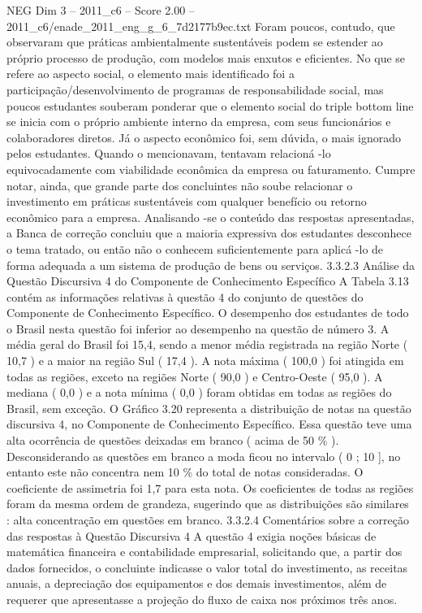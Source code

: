 \begin{textsample}{NEG Dim 3 – 2011\_c6 – Score 2.00 – 2011\_c6/enade\_2011\_eng\_g\_6\_7d2177b9ec.txt}
Foram poucos, contudo, que observaram que práticas ambientalmente sustentáveis podem se estender ao próprio processo de produção, com modelos mais enxutos e eficientes.
No que se refere ao aspecto social, o elemento mais identificado foi a participação/desenvolvimento de programas de responsabilidade social, mas poucos estudantes souberam ponderar que o elemento social do triple bottom line se inicia com o próprio ambiente interno da empresa, com seus funcionários e colaboradores diretos.
Já o aspecto econômico foi, sem dúvida, o mais ignorado pelos estudantes.
Quando o mencionavam, tentavam relacioná -lo equivocadamente com viabilidade econômica da empresa ou faturamento.
Cumpre notar, ainda, que grande parte dos concluintes não soube relacionar o investimento em práticas sustentáveis com qualquer benefício ou retorno econômico para a empresa.
Analisando -se o conteúdo das respostas apresentadas, a Banca de correção concluiu que a maioria expressiva dos estudantes desconhece o tema tratado, ou então não o conhecem suficientemente para aplicá -lo de forma adequada a um sistema de produção de bens ou serviços. 3.3.2.3 Análise da Questão Discursiva 4 do Componente de Conhecimento Específico A Tabela 3.13 contém as informações relativas à questão 4 do conjunto de questões do Componente de Conhecimento Específico.
O desempenho dos estudantes de todo o Brasil nesta questão foi inferior ao desempenho na questão de número 3.
A média geral do Brasil foi 15,4, sendo a menor média registrada na região Norte ( 10,7 ) e a maior na região Sul ( 17,4 ).
A nota máxima ( 100,0 ) foi atingida em todas as regiões, exceto na regiões Norte ( 90,0 ) e Centro-Oeste ( 95,0 ).
A mediana ( 0,0 ) e a nota mínima ( 0,0 ) foram obtidas em todas as regiões do Brasil, sem exceção.
O Gráfico 3.20 representa a distribuição de notas na questão discursiva 4, no Componente de Conhecimento Específico.
Essa questão teve uma alta ocorrência de questões deixadas em branco ( acima de 50 \% ).
Desconsiderando as questões em branco a moda ficou no intervalo ( 0 ; 10 ], no entanto este não concentra nem 10 \% do total de notas consideradas.
O coeficiente de assimetria foi 1,7 para esta nota.
Os coeficientes de todas as regiões foram da mesma ordem de grandeza, sugerindo que as distribuições são similares : alta concentração em questões em branco. 3.3.2.4 Comentários sobre a correção das respostas à Questão Discursiva 4 A questão 4 exigia noções básicas de matemática financeira e contabilidade empresarial, solicitando que, a partir dos dados fornecidos, o concluinte indicasse o valor total do investimento, as receitas anuais, a depreciação dos equipamentos e dos demais investimentos, além de requerer que apresentasse a projeção do fluxo de caixa nos próximos três anos.

\end{textsample}
